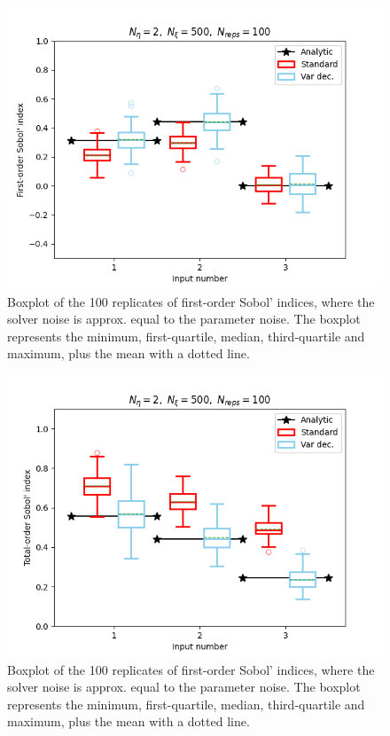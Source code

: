 \begin{figure}
    \centering
    \includegraphics{figures/medium_c/si_eta2_xi500.png}
    \caption{Boxplot of the 100 replicates of first-order Sobol’ indices, where the solver noise is approx. equal to the parameter noise. The boxplot represents the minimum, first-quartile, median, third-quartile and maximum, plus the mean with a dotted line.}
    \label{fig:mediumc-eta2-si}
\end{figure}
\begin{figure}
    \centering
    \includegraphics{figures/medium_c/ti_eta2_xi500.png}
    \caption{Boxplot of the 100 replicates of first-order Sobol’ indices, where the solver noise is approx. equal to the parameter noise. The boxplot represents the minimum, first-quartile, median, third-quartile and maximum, plus the mean with a dotted line.}
    \label{fig:mediumc-eta2-ti}
\end{figure}

